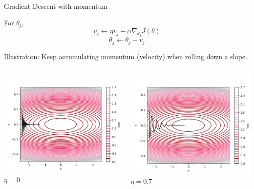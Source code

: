 \documentclass{beamer}
\begin{document}
\begin{frame}{Gradient Descent with momentum}
\begin{theorem}
    For $\theta_j$,
    $$v_j \leftarrow \eta v_j - \alpha \nabla_{\theta_j}J(\theta)$$
    $$\theta_j \leftarrow \theta_j - v_j$$
\end{theorem}

Illustration: Keep accumulating momentum (velocity) when rolling down a slope.

\begin{columns}[T,onlytextwidth]

	\centering 
	\includegraphics[width=1\columnwidth]{img/momentum0.png}
    $\eta = 0$
    
	\centering 
	\includegraphics[width=1\columnwidth]{img/momentum07.png}
	$\eta = 0.7$
	

\end{columns}
\end{frame}
\end{document}
